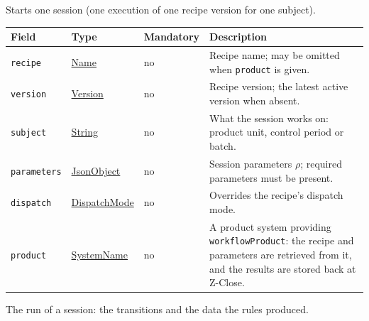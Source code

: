 \documentclass[a4paper]{arrowhead}
\newcommand{\mref}[1]{{\textcolor{ArrowheadPurple}{\hyperref[sec:model:#1]{#1}}}}
\newcommand{\pref}[1]{{\textcolor{ArrowheadGrey}{\hyperref[sec:model:primitives:#1]{#1}}}}
\begin{document}
Starts one session (one execution of one recipe version for one subject).

{\small
\begin{longtable}{|p{3.7cm}|p{4.2cm}|p{1.6cm}|p{6.3cm}|}

\hline
\rowcolor{gray!33} Field & Type & Mandatory & Description \\ \hline
\endhead
\texttt{recipe} & \pref{Name} & no & Recipe name; may be omitted when \texttt{product} is given. \\ \hline
\texttt{version} & \pref{Version} & no & Recipe version; the latest active version when absent. \\ \hline
\texttt{subject} & \pref{String} & no & What the session works on: product unit, control period or batch. \\ \hline
\texttt{parameters} & \pref{JsonObject} & no & Session parameters $\rho$; required parameters must be present. \\ \hline
\texttt{dispatch} & \mref{DispatchMode} & no & Overrides the recipe's dispatch mode. \\ \hline
\texttt{product} & \pref{SystemName} & no & A product system providing \texttt{workflowProduct}: the recipe and parameters are retrieved from it, and the results are stored back at Z-Close. \\ \hline
\end{longtable}
}

The run of a session: the transitions and the data the rules produced.
\end{document}
